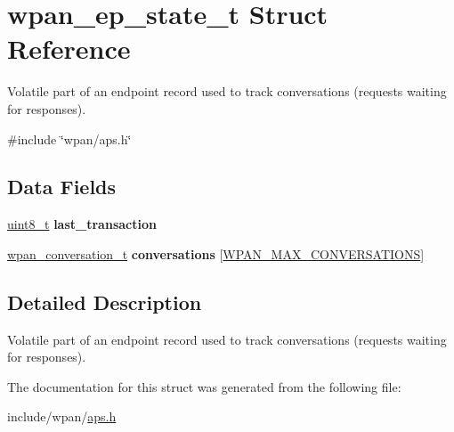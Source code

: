 \hypertarget{structwpan__ep__state__t}{\section{wpan\-\_\-ep\-\_\-state\-\_\-t Struct Reference}
\label{structwpan__ep__state__t}
}


Volatile part of an endpoint record used to track conversations (requests waiting for responses).  




{\ttfamily \#include \char`\"{}wpan/aps.\-h\char`\"{}}

\subsection*{Data Fields}
\begin{DoxyCompactItemize}
\item 
\hypertarget{group__wpan__aps_ga9e18c6583d7c94f03b10fc1e99187939}{\hyperlink{group__hal_gae1affc9ca37cfb624959c866a73f83c2}{uint8\-\_\-t} {\bfseries last\-\_\-transaction}}\label{group__wpan__aps_ga9e18c6583d7c94f03b10fc1e99187939}

\item 
\hypertarget{group__wpan__aps_gaf9565ebe099d08e3f9f26783a4f89826}{\hyperlink{structwpan__conversation__t}{wpan\-\_\-conversation\-\_\-t} {\bfseries conversations} \mbox{[}\hyperlink{group__wpan__aps_gae34b1efc8ba99add17fcd767852197d4}{W\-P\-A\-N\-\_\-\-M\-A\-X\-\_\-\-C\-O\-N\-V\-E\-R\-S\-A\-T\-I\-O\-N\-S}\mbox{]}}\label{group__wpan__aps_gaf9565ebe099d08e3f9f26783a4f89826}

\end{DoxyCompactItemize}


\subsection{Detailed Description}
Volatile part of an endpoint record used to track conversations (requests waiting for responses). 



The documentation for this struct was generated from the following file\-:\begin{DoxyCompactItemize}
\item 
include/wpan/\hyperlink{aps_8h}{aps.\-h}\end{DoxyCompactItemize}
